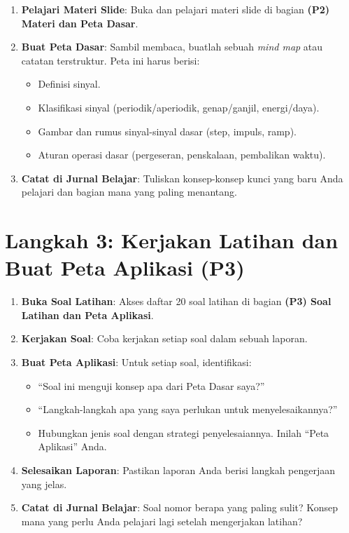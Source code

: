 \documentclass[
  letterpaper,
  DIV=11,
  numbers=noendperiod]{scrreprt}
\providecommand{\tightlist}{%
  \setlength{\itemsep}{0pt}\setlength{\parskip}{0pt}}
\begin{document}
\begin{enumerate}
\def\labelenumi{\arabic{enumi}.}
\tightlist
\item
  \textbf{Pelajari Materi Slide}: Buka dan pelajari materi slide di
  bagian \textbf{(P2) Materi dan Peta Dasar}.
\item
  \textbf{Buat Peta Dasar}: Sambil membaca, buatlah sebuah \emph{mind
  map} atau catatan terstruktur. Peta ini harus berisi:

  \begin{itemize}
  \tightlist
  \item
    Definisi sinyal.
  \item
    Klasifikasi sinyal (periodik/aperiodik, genap/ganjil, energi/daya).
  \item
    Gambar dan rumus sinyal-sinyal dasar (step, impuls, ramp).
  \item
    Aturan operasi dasar (pergeseran, penskalaan, pembalikan waktu).
  \end{itemize}
\item
  \textbf{Catat di Jurnal Belajar}: Tuliskan konsep-konsep kunci yang
  baru Anda pelajari dan bagian mana yang paling menantang.
\end{enumerate}

\section*{\texorpdfstring{\textbf{Langkah 3: Kerjakan Latihan dan Buat
Peta Aplikasi
(P3)}}{Langkah 3: Kerjakan Latihan dan Buat Peta Aplikasi (P3)}}\label{langkah-3-kerjakan-latihan-dan-buat-peta-aplikasi-p3}


\begin{enumerate}
\def\labelenumi{\arabic{enumi}.}
\tightlist
\item
  \textbf{Buka Soal Latihan}: Akses daftar 20 soal latihan di bagian
  \textbf{(P3) Soal Latihan dan Peta Aplikasi}.
\item
  \textbf{Kerjakan Soal}: Coba kerjakan setiap soal dalam sebuah
  laporan.
\item
  \textbf{Buat Peta Aplikasi}: Untuk setiap soal, identifikasi:

  \begin{itemize}
  \tightlist
  \item
    ``Soal ini menguji konsep apa dari Peta Dasar saya?''
  \item
    ``Langkah-langkah apa yang saya perlukan untuk menyelesaikannya?''
  \item
    Hubungkan jenis soal dengan strategi penyelesaiannya. Inilah ``Peta
    Aplikasi'' Anda.
  \end{itemize}
\item
  \textbf{Selesaikan Laporan}: Pastikan laporan Anda berisi langkah
  pengerjaan yang jelas.
\item
  \textbf{Catat di Jurnal Belajar}: Soal nomor berapa yang paling sulit?
  Konsep mana yang perlu Anda pelajari lagi setelah mengerjakan latihan?
\end{enumerate}
\end{document}
